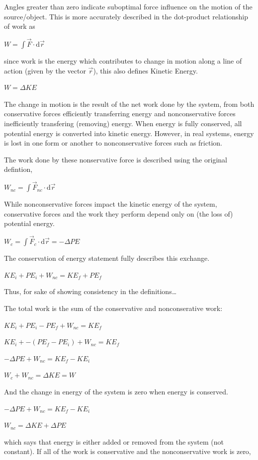 \documentclass[
  letterpaper,
  DIV=11,
  numbers=noendperiod]{scrartcl}
\begin{document}
Angles greater than zero indicate suboptimal force influence on the
motion of the source/object. This is more accurately described in the
dot-product relationship of work as

\(W = \int \vec{F}\cdot \mathrm{d}\vec{r}\)

since work is the energy which contributes to change in motion along a
line of action (given by the vector \(\vec{r}\)), this also defines
Kinetic Energy.

\(W= \Delta KE\)

The change in motion is the result of the net work done by the system,
from both conservative forces efficiently transferring energy and
nonconservative forces inefficiently transfering (removing) energy. When
energy is fully conserved, all potential energy is converted into
kinetic energy. However, in real systems, energy is lost in one form or
another to nonconservative forces such as friction.

The work done by these nonservative force is described using the
original defintion,

\(W_{nc} = \int \vec{F}_{nc}\cdot \mathrm{d}\vec{r}\)

While nonconservative forces impact the kinetic energy of the system,
conservative forces and the work they perform depend only on (the loss
of) potential energy.

\(W_{c} = \int \vec{F}_{c}\cdot \mathrm{d}\vec{r} = -\Delta PE\)

The conservation of energy statement fully describes this exchange.

\({KE}_i+{PE}_i +W_{nc}={KE}_f+{PE}_f\)

Thus, for sake of showing consistency in the definitions\ldots{}

The total work is the sum of the conservative and nonconserative work:

\({KE}_i+{PE}_i -{PE}_f+W_{nc}={KE}_f\)

\({KE}_i+-({PE}_f -{PE}_i)+W_{nc}={KE}_f\)

\(-\Delta PE+W_{nc}={KE}_f-{KE}_i\)

\(W_{c}+W_{nc}= \Delta KE = W\)

And the change in energy of the system is zero when energy is conserved.

\(-\Delta PE+W_{nc}={KE}_f-{KE}_i\)

\(W_{nc}=\Delta KE+\Delta PE\)

which says that energy is either added or removed from the system (not
constant). If all of the work is conservative and the nonconservative
work is zero,
\end{document}
